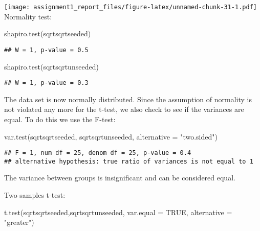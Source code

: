 \documentclass[
]{article}
\newenvironment{Shaded}{\begin{snugshade}}{\end{snugshade}}
\newcommand{\AttributeTok}[1]{\textcolor[rgb]{0.77,0.63,0.00}{#1}}
\newcommand{\ConstantTok}[1]{\textcolor[rgb]{0.00,0.00,0.00}{#1}}
\newcommand{\FunctionTok}[1]{\textcolor[rgb]{0.00,0.00,0.00}{#1}}
\newcommand{\NormalTok}[1]{#1}
\newcommand{\StringTok}[1]{\textcolor[rgb]{0.31,0.60,0.02}{#1}}
\begin{document}
\texttt{[image: assignment1\_report\_files/figure-latex/unnamed-chunk-31-1.pdf]}
Normality test:

\begin{Shaded}
\begin{Highlighting}[]
\FunctionTok{shapiro.test}\NormalTok{(sqrtsqrtseeded)}
\end{Highlighting}
\end{Shaded}

\begin{verbatim}
## W = 1, p-value = 0.5
\end{verbatim}

\begin{Shaded}
\begin{Highlighting}[]
\FunctionTok{shapiro.test}\NormalTok{(sqrtsqrtunseeded)}
\end{Highlighting}
\end{Shaded}

\begin{verbatim}
## W = 1, p-value = 0.3
\end{verbatim}

The data set is now normally distributed. Since the assumption of
normality is not violated any more for the t-test, we also check to see
if the variances are equal. To do this we use the F-test:

\begin{Shaded}
\begin{Highlighting}[]
\FunctionTok{var.test}\NormalTok{(sqrtsqrtseeded, sqrtsqrtunseeded, }\AttributeTok{alternative =} \StringTok{"two.sided"}\NormalTok{)}
\end{Highlighting}
\end{Shaded}

\begin{verbatim}
## F = 1, num df = 25, denom df = 25, p-value = 0.4
## alternative hypothesis: true ratio of variances is not equal to 1
\end{verbatim}

The variance between groups is insignificant and can be considered
equal.

Two samples t-test:

\begin{Shaded}
\begin{Highlighting}[]
\FunctionTok{t.test}\NormalTok{(sqrtsqrtseeded,sqrtsqrtunseeded, }\AttributeTok{var.equal =} \ConstantTok{TRUE}\NormalTok{, }\AttributeTok{alternative =} \StringTok{"greater"}\NormalTok{)}
\end{Highlighting}
\end{Shaded}
\end{document}
